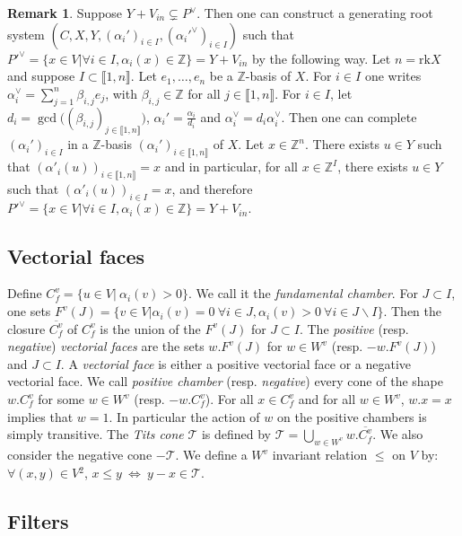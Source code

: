\documentclass[12pt]{article}
\theoremstyle{plain}
\theoremstyle{definition}
\newtheorem{rque}[thm]{Remark}
\newcommand{\Z}{\mathbb{Z}}
\begin{document}
\begin{rque}
Suppose $Y+V_{in}\varsubsetneq P^\vee$. Then one can construct a generating root system $(C,X,Y,(\alpha_i')_{i\in I},(\alpha_i'^\vee)_{i\in I})$ such that $P'^\vee=\{x\in V|\forall i\in I, \alpha_i(x)\in \Z\}=Y+V_{in}$ by the following way.
 Let $n=\mathrm{rk} X$ and suppose $I\subset\llbracket 1,n\rrbracket$. Let $e_1,\ldots,e_n$ be a $\mathbb{Z}$-basis of $X$. For $i\in I$ one writes 
$\alpha_i^\vee=\sum_{j=1}^n\beta_{i,j}e_j$, with $\beta_{i,j}\in \Z$ for all $j\in\llbracket 1,n\rrbracket$. For $i\in I$, let 
$d_i=\gcd\big((\beta_{i,j})_{j\in \llbracket 1 ,n\rrbracket}\big)$,  $\alpha_i'=\frac{\alpha_i}{d_i}$ and $\alpha_i^\vee=d_i\alpha_i^\vee$. Then one can complete $(\alpha_i')_{i\in I}$ in a $\Z$-basis $(\alpha_i')_{i\in \llbracket 1, n\rrbracket} $ of $X$. Let $x\in \Z^n$. There exists $u\in Y$ such that $(\alpha'_i(u))_{i\in \llbracket 1,n\rrbracket}=x$ and in particular, for all $x\in \Z^I$, there exists $u\in Y$ such that $(\alpha'_i(u))_{i\in I}=x$, and therefore $P'^\vee=\{x\in V|\forall i\in I, \alpha_i(x)\in \Z\}=Y+V_{in}.$
\end{rque}

\subsection{Vectorial faces}

Define $C_f^v=\{u\in V|\ \alpha_i(v)>0\}$. We call it the \textit{fundamental chamber}. For $J\subset I$, one sets $F^v(J)=\{v\in V|\alpha_i(v)=0\ \forall i\in J,\alpha_i(v)>0\ \forall i\in J\backslash I\}$. Then the closure $\overline{C_f^v}$ of $C_f^v$ is the union of the $F^v(J)$ for $J\subset I$. The \textit{positive} (resp. \textit{negative}) \textit{vectorial faces} are the sets $w.F^v(J)$ for $w\in W^v$ (resp. $-w.F^v(J)$) and $J\subset I$. A \textit{vectorial face} is either a positive vectorial face or a negative vectorial face. We call \textit{positive chamber} (resp. \textit{negative}) every cone  of the shape $w.C_f^v$ for some $w\in W^v$ (resp. $-w.C_f^v$).  For all $x\in C_f^v$ and for all $w\in W^v$, $w.x=x$ implies that $w=1$. In particular the action of $w$ on the positive chambers is simply transitive. The \textit{Tits cone} $\mathcal T$ is defined by $\mathcal{T}=\bigcup_{w\in W^v} w.\overline{C^v_f}$. We also consider the negative cone $-\mathcal{T}$.
We define a $W^v$ invariant relation $\leq$ on $V$ by: $\forall (x,y)\in V\mathrm{}^2$, $x\leq y\ \Leftrightarrow\ y-x\in \mathcal{T}$.


\subsection{Filters}
\end{document}
